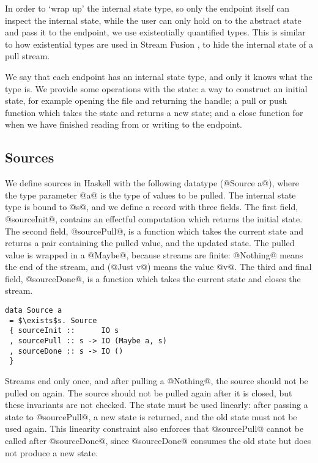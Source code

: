 In order to `wrap up' the internal state type, so only the endpoint itself can inspect the internal state, while the user can only hold on to the abstract state and pass it to the endpoint, we use existentially quantified types.
This is similar to how existential types are used in Stream Fusion \cite{coutts2007stream}, to hide the internal state of a pull stream.

We say that each endpoint has an internal state type, and only it knows what the type is.
We provide some operations with the state: a way to construct an initial state, for example opening the file and returning the handle; a pull or push function which takes the state and returns a new state; and a close function for when we have finished reading from or writing to the endpoint.

\subsection{Sources}

We define sources in Haskell with the following datatype (@Source a@), where the type parameter @a@ is the type of values to be pulled.
The internal state type is bound to @s@, and we define a record with three fields.
The first field, @sourceInit@, contains an effectful computation which returns the initial state.
The second field, @sourcePull@, is a function which takes the current state and returns a pair containing the pulled value, and the updated state.
The pulled value is wrapped in a @Maybe@, because streams are finite: @Nothing@ means the end of the stream, and (@Just v@) means the value @v@.
The third and final field, @sourceDone@, is a function which takes the current state and closes the stream.

\begin{lstlisting}[mathescape=true]
data Source a
 = $\exists$s. Source
 { sourceInit ::      IO s
 , sourcePull :: s -> IO (Maybe a, s)
 , sourceDone :: s -> IO ()
 }
\end{lstlisting}

Streams end only once, and after pulling a @Nothing@, the source should not be pulled on again.
The source should not be pulled again after it is closed, but these invariants are not checked.
The state must be used linearly: after passing a state to @sourcePull@, a new state is returned, and the old state must not be used again.
This linearity constraint also enforces that @sourcePull@ cannot be called after @sourceDone@, since @sourceDone@ consumes the old state but does not produce a new state.

